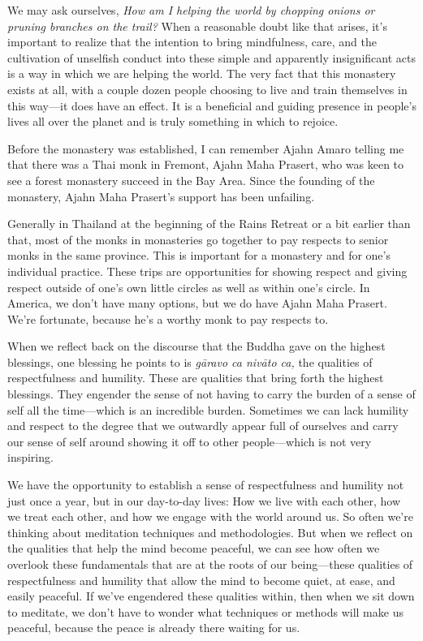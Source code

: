We may ask ourselves, \emph{How am I helping the world by chopping 
onions or pruning branches on the trail?} When a reasonable doubt like 
that arises, it's important to realize that the intention to bring 
mindfulness, care, and the cultivation of unselfish conduct into these 
simple and apparently insignificant acts is a way in which we are 
helping the world. The very fact that this monastery exists at all, 
with a couple dozen people choosing to live and train themselves in 
this way---it does have an effect. It is a beneficial and guiding 
presence in people's lives all over the planet and is truly something 
in which to rejoice.


Before the monastery was established, I can remember Ajahn Amaro 
telling me that there was a Thai monk in Fremont, Ajahn Maha Prasert, 
who was keen to see a forest monastery succeed in the Bay Area. Since 
the founding of the monastery, Ajahn Maha Prasert's support has been 
unfailing.

Generally in Thailand at the beginning of the Rains Retreat or a bit 
earlier than that, most of the monks in monasteries go together to pay 
respects to senior monks in the same province. This is important for a 
monastery and for one's individual practice. These trips are 
opportunities for showing respect and giving respect outside of one's 
own little circles as well as within one's circle. In America, we don't 
have many options, but we do have Ajahn Maha Prasert. We're fortunate, 
because he's a worthy monk to pay respects to.

When we reflect back on the discourse that the Buddha gave on the 
highest blessings, one blessing he points to is \emph{gāravo ca 
nivāto ca,} the qualities of respectfulness and humility. These are 
qualities that bring forth the highest blessings. They engender the 
sense of not having to carry the burden of a sense of self all the 
time---which is an incredible burden. Sometimes we can lack humility 
and respect to the degree that we outwardly appear full of ourselves 
and carry our sense of self around showing it off to other 
people---which is not very inspiring.

We have the opportunity to establish a sense of respectfulness and 
humility not just once a year, but in our day-to-day lives: How we live 
with each other, how we treat each other, and how we engage with the 
world around us. So often we're thinking about meditation techniques 
and methodologies. But when we reflect on the qualities that help the 
mind become peaceful, we can see how often we overlook these 
fundamentals that are at the roots of our being---these qualities of 
respectfulness and humility that allow the mind to become quiet, at 
ease, and easily peaceful. If we've engendered these qualities within, 
then when we sit down to meditate, we don't have to wonder what 
techniques or methods will make us peaceful, because the peace is 
already there waiting for us.

